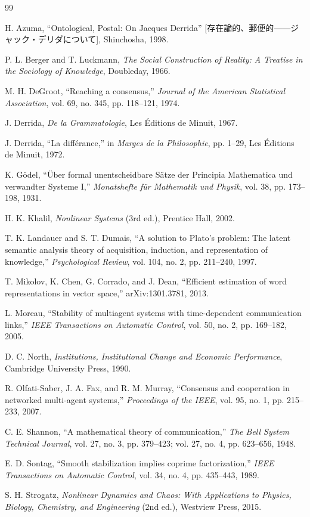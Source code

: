 \documentclass[11pt,a4paper]{article}
\theoremstyle{definition}
\begin{document}
\begin{thebibliography}{99}

 H. Azuma, ``Ontological, Postal: On Jacques Derrida'' [存在論的、郵便的――ジャック・デリダについて], Shinchosha, 1998.

 P. L. Berger and T. Luckmann, \textit{The Social Construction of Reality: A Treatise in the Sociology of Knowledge}, Doubleday, 1966.

 M. H. DeGroot, ``Reaching a consensus,'' \textit{Journal of the American Statistical Association}, vol. 69, no. 345, pp. 118--121, 1974.

 J. Derrida, \textit{De la Grammatologie}, Les Éditions de Minuit, 1967.

 J. Derrida, ``La différance,'' in \textit{Marges de la Philosophie}, pp. 1--29, Les Éditions de Minuit, 1972.

 K. Gödel, ``Über formal unentscheidbare Sätze der Principia Mathematica und verwandter Systeme I,'' \textit{Monatshefte für Mathematik und Physik}, vol. 38, pp. 173--198, 1931.

 H. K. Khalil, \textit{Nonlinear Systems} (3rd ed.), Prentice Hall, 2002.

 T. K. Landauer and S. T. Dumais, ``A solution to Plato's problem: The latent semantic analysis theory of acquisition, induction, and representation of knowledge,'' \textit{Psychological Review}, vol. 104, no. 2, pp. 211--240, 1997.

 T. Mikolov, K. Chen, G. Corrado, and J. Dean, ``Efficient estimation of word representations in vector space,'' arXiv:1301.3781, 2013.

 L. Moreau, ``Stability of multiagent systems with time-dependent communication links,'' \textit{IEEE Transactions on Automatic Control}, vol. 50, no. 2, pp. 169--182, 2005.

 D. C. North, \textit{Institutions, Institutional Change and Economic Performance}, Cambridge University Press, 1990.

 R. Olfati-Saber, J. A. Fax, and R. M. Murray, ``Consensus and cooperation in networked multi-agent systems,'' \textit{Proceedings of the IEEE}, vol. 95, no. 1, pp. 215--233, 2007.

 C. E. Shannon, ``A mathematical theory of communication,'' \textit{The Bell System Technical Journal}, vol. 27, no. 3, pp. 379--423; vol. 27, no. 4, pp. 623--656, 1948.

 E. D. Sontag, ``Smooth stabilization implies coprime factorization,'' \textit{IEEE Transactions on Automatic Control}, vol. 34, no. 4, pp. 435--443, 1989.

 S. H. Strogatz, \textit{Nonlinear Dynamics and Chaos: With Applications to Physics, Biology, Chemistry, and Engineering} (2nd ed.), Westview Press, 2015.

\end{thebibliography}
\end{document}
